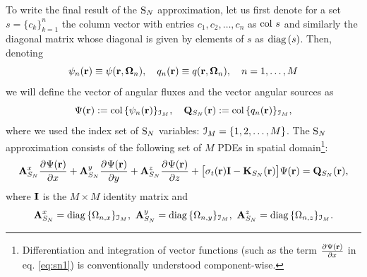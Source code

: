 To write  the final result of the $\text{S}_{N}$ approximation, let us first denote for a set $s = \{c_k\}_{k=1}^n$ the column
vector with entries $c_1,c_2,\ldots,c_n$ as $\operatorname{col\,} s$ and similarly the diagonal matrix whose diagonal is
given by elements of $s$ as $\operatorname{diag\,}(s)$. Then, denoting
\begin{equation}\label{eq:sn_vecs}
\psi_n(\mathbf{r}) \equiv \psi(\mathbf{r},\mathbf{\Omega}_n), \quad q_n(\mathbf{r}) \equiv
q(\mathbf{r},\mathbf{\Omega}_n),\quad n = 1,\ldots, M	
\end{equation}
we will define the vector of angular fluxes and the vector angular sources as
\begin{equation}\label{eq:sn_vars}
\Psi(\mathbf{r}) := \operatorname{col\,}\{\psi_n(\mathbf{r})\}_{\mathcal{I}_{M}},\quad
\mathbf{Q}_{S_N}(\mathbf{r}) := \operatorname{col\,}\{q_n(\mathbf{r})\}_{\mathcal{I}_{M}},
\end{equation}
where we used the index set of $\text{S}_{N}$ variables: $\mathcal{I}_{M} = \{1,2,\ldots,M\}$.
The $\text{S}_{N}$ approximation consists of the following set of $M$ PDEs in spatial domain\footnote{Differentiation and
integration of vector functions (such as the term $\frac{\partial^{}\Psi(\mathbf{r})}{\partial x^{}}$ in eq. \eqref{eq:sn1}) is conventionally
understood component-wise.}:
\begin{equation}\label{eq:sn1} 
\mathbf{A}_{S_N}^x\frac{\partial^{}\Psi(\mathbf{r})}{\partial x^{}} + \mathbf{A}_{S_N}^y\frac{\partial^{}\Psi(\mathbf{r})}{\partial y^{}} +
\mathbf{A}_{S_N}^z\frac{\partial^{}\Psi(\mathbf{r})}{\partial z^{}} + \bigl[\sigma_t(\mathbf{r})\mathbf{I} - \mathbf{K}_{S_N}(\mathbf{r})\bigr]\Psi(\mathbf{r}) = \mathbf{Q}_{S_N}(\mathbf{r}),
\end{equation}
where $\mathbf{I}$ is the $M\times M$ identity matrix and
$$
	\mathbf{A}_{S_N}^x = \operatorname{diag\,}\{\Omega_{n,x}\}_{\mathcal{I}_{M}},\ \mathbf{A}_{S_N}^y = \operatorname{diag\,}\{\Omega_{n,y}\}_{\mathcal{I}_{M}},\
	\mathbf{A}_{S_N}^z = \operatorname{diag\,}\{\Omega_{n,z}\}_{\mathcal{I}_{M}}.
$$

